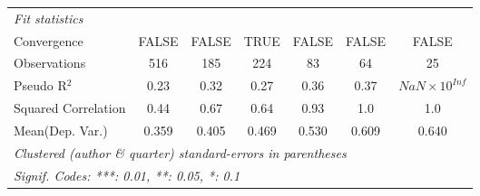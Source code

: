 \begin{tabular}{lcccccc}
   \midrule
   \emph{Fit statistics}\\
   Convergence                                                &FALSE         & FALSE         & TRUE         & FALSE     & FALSE         & FALSE\\  
   Observations                                               & 516          & 185           & 224          & 83        & 64            & 25\\  
   Pseudo R$^2$                                               & 0.23         & 0.32          & 0.27         & 0.36      & 0.37          & $NaN\times 10^{Inf}$\\   
   Squared Correlation                                        & 0.44         & 0.67          & 0.64         & 0.93      & 1.0           & 1.0\\  
Mean(Dep. Var.) & 0.359 & 0.405 & 0.469 & 0.530 & 0.609 & 0.640 \\
   \midrule \midrule
   \multicolumn{7}{l}{\emph{Clustered (author \& quarter) standard-errors in parentheses}}\\
   \multicolumn{7}{l}{\emph{Signif. Codes: ***: 0.01, **: 0.05, *: 0.1}}\\
\end{tabular}
\par\endgroup
